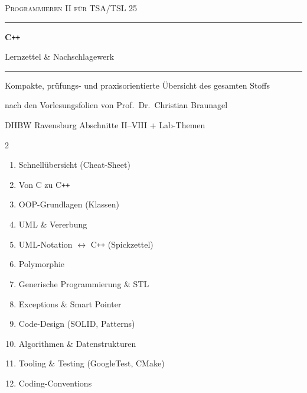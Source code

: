 \documentclass[11pt,a4paper]{scrartcl}
\begin{document}
\begin{titlepage}
\centering
\vspace*{1.4cm}
{\Large\scshape Programmieren II f\"ur TSA/TSL 25\par}
\vspace{0.4cm}
{\color{defblue}\rule{\linewidth}{1.2pt}}\par
\vspace{0.8cm}
{\Huge\bfseries C\texttt{++}\par}
\vspace{0.5cm}
{\LARGE Lernzettel \& Nachschlagewerk\par}
\vspace{0.4cm}
{\color{defblue}\rule{\linewidth}{1.2pt}}\par
\vspace{1.0cm}
{\large Kompakte, pr\"ufungs- und praxisorientierte \"Ubersicht des gesamten Stoffs\par}
\vspace{0.3cm}
{\normalsize nach den Vorlesungsfolien von Prof.\ Dr.\ Christian Braunagel\par}
{\small DHBW Ravensburg \textperiodcentered{} Abschnitte II--VIII + Lab-Themen\par}

\vspace{1.1cm}
\begin{tcolorbox}[width=0.9\linewidth,colback=defbluebg,colframe=defblue,
  halign=left,title={\bfseries Inhalt dieses Lernzettels},fonttitle=\bfseries]
\begin{multicols}{2}
\begin{enumerate}[leftmargin=*,itemsep=1pt]
  \item Schnell\"ubersicht (Cheat-Sheet)
  \item Von C zu C\texttt{++}
  \item OOP-Grundlagen (Klassen)
  \item UML \& Vererbung
  \item UML-Notation $\leftrightarrow$ C\texttt{++} (Spickzettel)
  \item Polymorphie
  \item Generische Programmierung \& STL
  \item Exceptions \& Smart Pointer
  \item Code-Design (SOLID, Patterns)
  \item Algorithmen \& Datenstrukturen
  \item Tooling \& Testing (GoogleTest, CMake)
  \item Coding-Conventions
\end{enumerate}
\end{multicols}
\end{tcolorbox}


\end{titlepage}
\end{document}
